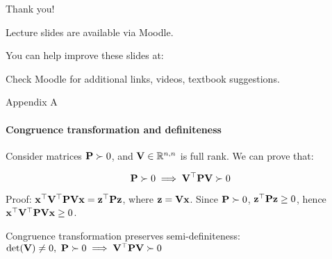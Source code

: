 \documentclass{beamer}
\begin{document}
\begin{frame}{Thank you!}
	\centerline{Lecture slides are available via Moodle.}
	\bigskip
	\centerline{You can help improve these slides at:}
	\centerline{\mygit}
	\bigskip
	\centerline{Check Moodle for additional links, videos, textbook suggestions.}
	\bigskip
	
	\centerline{\textcolor{black}{}}
\end{frame}




\begin{frame}{Appendix A}
	\framesubtitle{Congruence transformation and definiteness}
	\begin{flushleft}
		
		Consider matrices $\mathbf{P} \succ 0$, and $\mathbf{V} \in \mathbb{R}^{n, n}$ is full rank. We can prove that:
		
		\begin{equation}
			\mathbf{P} \succ 0 \implies \mathbf{V}^\top\mathbf{P}\mathbf{V} \succ 0
		\end{equation}
		
		Proof: $\mathbf{x}^\top\mathbf{V}^\top\mathbf{P}\mathbf{V}\mathbf{x} = \mathbf{z}^\top\mathbf{P}\mathbf{z}$, where $\mathbf{z} = \mathbf{V}\mathbf{x}$. Since $\mathbf{P} \succ 0$, $\mathbf{z}^\top\mathbf{P}\mathbf{z} \geq 0$, hence $\mathbf{x}^\top\mathbf{V}^\top\mathbf{P}\mathbf{V}\mathbf{x} \geq 0$. 
		
		\begin{definition}
			Congruence transformation preserves semi-definiteness: $\text{det}(\mathbf{V}) \neq 0, \ \mathbf{P} \succ 0 \implies \mathbf{V}^\top\mathbf{P}\mathbf{V} \succ 0$
		\end{definition}
		
		
	\end{flushleft}
\end{frame}
\end{document}
